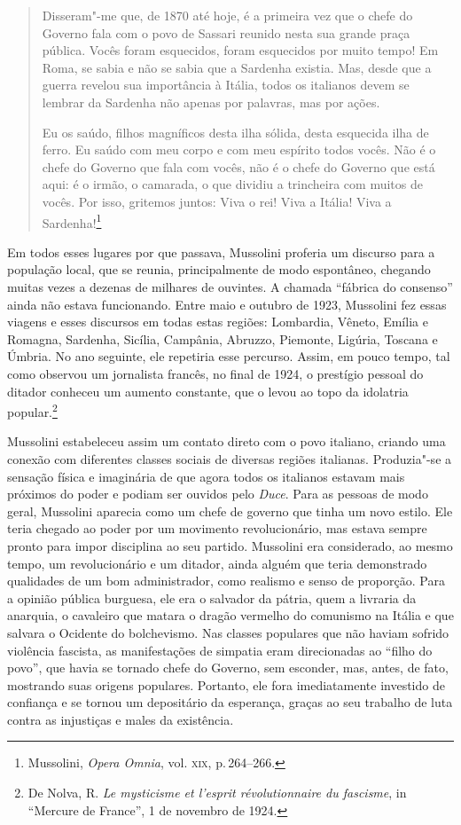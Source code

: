 \begin{quote}
Disseram"-me que, de 1870 até hoje, é a primeira vez que o chefe do
Governo fala com o povo de Sassari reunido nesta sua grande praça
pública. Vocês foram esquecidos, foram esquecidos por muito tempo! Em
Roma, se sabia e não se sabia que a Sardenha existia. Mas, desde que a
guerra revelou sua importância à Itália, todos os italianos devem se
lembrar da Sardenha não apenas por palavras, mas por ações.

Eu os saúdo, filhos magníficos desta ilha sólida, desta esquecida ilha
de ferro. Eu saúdo com meu corpo e com meu espírito todos vocês. Não é o
chefe do Governo que fala com vocês, não é o chefe do Governo que está
aqui: é o irmão, o camarada, o que dividiu a trincheira com muitos de
vocês. Por isso, gritemos juntos: Viva o rei! Viva a Itália! Viva a
Sardenha!\footnote{Mussolini, \emph{Opera Omnia}, vol. \textsc{xix}, p.\,264--266.}
\end{quote}

Em todos esses lugares por que passava, Mussolini proferia um discurso
para a população local, que se reunia, principalmente de modo
espontâneo, chegando muitas vezes a dezenas de milhares de ouvintes. A
chamada ``fábrica do consenso'' ainda não estava funcionando. Entre maio e
outubro de 1923, Mussolini fez essas viagens e esses discursos em todas
estas regiões: Lombardia, Vêneto, Emília e Romagna, Sardenha, Sicília,
Campânia, Abruzzo, Piemonte, Ligúria, Toscana e Úmbria. No ano seguinte,
ele repetiria esse percurso. Assim, em pouco tempo, tal como observou um
jornalista francês, no final de 1924, o prestígio pessoal do ditador
conheceu um aumento constante, que o levou ao topo da idolatria popular.\footnote{De Nolva, R. \emph{Le mysticisme et l'esprit révolutionnaire
  du fascisme}, in ``Mercure de France'', 1 de novembro de 1924.}

Mussolini estabeleceu assim um contato direto com o povo italiano,
criando uma conexão com diferentes classes sociais de diversas regiões
italianas. Produzia"-se a sensação física e imaginária de que agora todos
os italianos estavam mais próximos do poder e podiam ser ouvidos pelo
\emph{Duce}. Para as pessoas de modo geral, Mussolini aparecia como um
chefe de governo que tinha um novo estilo. Ele teria chegado ao poder
por um movimento revolucionário, mas estava sempre pronto para impor
disciplina ao seu partido. Mussolini era considerado, ao mesmo tempo, um
revolucionário e um ditador, ainda alguém que teria demonstrado
qualidades de um bom administrador, como realismo e senso de proporção.
Para a opinião pública burguesa, ele era o salvador da pátria, quem a
livraria da anarquia, o cavaleiro que matara o dragão vermelho do
comunismo na Itália e que salvara o Ocidente do bolchevismo. Nas classes
populares que não haviam sofrido violência fascista, as manifestações de
simpatia eram direcionadas ao ``filho do povo'', que havia se tornado
chefe do Governo, sem esconder, mas, antes, de fato, mostrando suas
origens populares. Portanto, ele fora imediatamente investido de
confiança e se tornou um depositário da esperança, graças ao seu
trabalho de luta contra as injustiças e males da existência.


